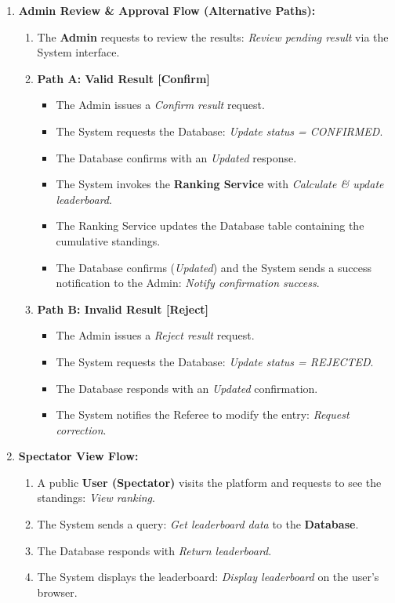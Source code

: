 \begin{enumerate}
	\item \textbf{Admin Review \& Approval Flow (Alternative Paths):}
	\begin{enumerate}
		\item The \textbf{Admin} requests to review the results: \textit{Review pending result} via the System interface.
		\item \textbf{Path A: Valid Result [Confirm]}
		\begin{itemize}
			\item The Admin issues a \textit{Confirm result} request.
			\item The System requests the Database: \textit{Update status = CONFIRMED}.
			\item The Database confirms with an \textit{Updated} response.
			\item The System invokes the \textbf{Ranking Service} with \textit{Calculate \& update leaderboard}.
			\item The Ranking Service updates the Database table containing the cumulative standings.
			\item The Database confirms (\textit{Updated}) and the System sends a success notification to the Admin: \textit{Notify confirmation success}.
		\end{itemize}
		\item \textbf{Path B: Invalid Result [Reject]}
		\begin{itemize}
			\item The Admin issues a \textit{Reject result} request.
			\item The System requests the Database: \textit{Update status = REJECTED}.
			\item The Database responds with an \textit{Updated} confirmation.
			\item The System notifies the Referee to modify the entry: \textit{Request correction}.
		\end{itemize}
	\end{enumerate}
	
	\item \textbf{Spectator View Flow:}
	\begin{enumerate}
		\item A public \textbf{User (Spectator)} visits the platform and requests to see the standings: \textit{View ranking}.
		\item The System sends a query: \textit{Get leaderboard data} to the \textbf{Database}.
		\item The Database responds with \textit{Return leaderboard}.
		\item The System displays the leaderboard: \textit{Display leaderboard} on the user's browser.
	\end{enumerate}
\end{enumerate}

